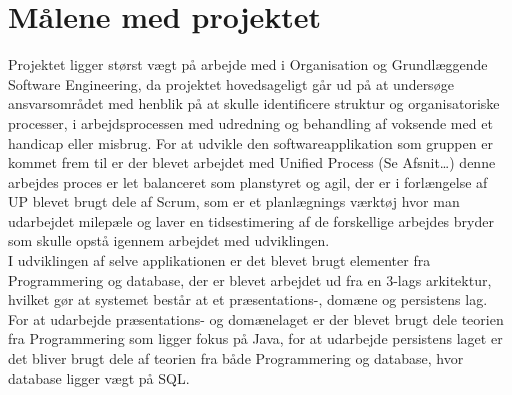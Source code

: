 \section{Målene med projektet}
Projektet ligger størst vægt på arbejde med i Organisation og Grundlæggende Software Engineering, da projektet hovedsageligt går ud på at undersøge ansvarsområdet med henblik på at skulle identificere struktur og organisatoriske processer, i arbejdsprocessen med udredning og behandling af voksende med et handicap eller misbrug. For at udvikle den softwareapplikation som gruppen er kommet frem til er der blevet arbejdet med Unified Process 
(Se Afsnit…) %
denne arbejdes proces er let balanceret som planstyret og agil, der er i forlængelse af UP blevet brugt dele af Scrum, som er et planlægnings værktøj hvor man udarbejdet milepæle og laver en tidsestimering af de forskellige arbejdes bryder som skulle opstå igennem arbejdet med udviklingen.\\
I udviklingen af selve applikationen er det blevet brugt elementer fra Programmering og database, der er blevet arbejdet ud fra en 3-lags arkitektur, hvilket gør at systemet består at et præsentations-, domæne og persistens lag. For at udarbejde præsentations- og domænelaget er der blevet brugt dele teorien fra Programmering som ligger fokus på Java, for at udarbejde persistens laget er det bliver brugt dele af teorien fra både Programmering og database, hvor database ligger vægt på SQL.


